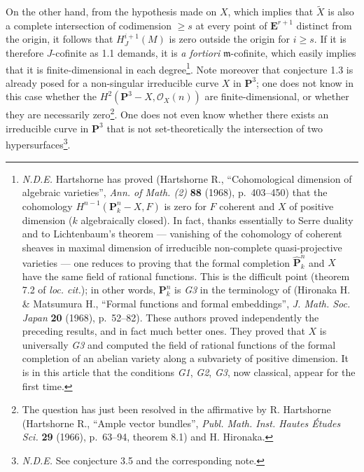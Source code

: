 \documentclass[
]{article}
\begin{document}
On the other hand, from the hypothesis made on \(X\), which implies that
\(\tilde{X}\) is also a complete intersection of codimension
\(\geqslant s\) at every point of \(\mathbf{E}^{r+1}\) distinct from the
origin, it follows that \(H^{i+1}_{J}(M)\) is zero outside the origin
for \(i \geqslant s\). If it is therefore \(J\)-cofinite as 1.1 demands,
it is \emph{a fortiori} \(\mathfrak{m}\)-cofinite, which easily implies
that it is finite-dimensional in each degree\footnote{\emph{N.D.E.}
  Hartshorne has proved (Hartshorne R., ``Cohomological dimension of
  algebraic varieties'', \emph{Ann. of Math. (2)} \textbf{88} (1968),
  p.~403--450) that the cohomology
  \(H^{n-1}(\mathbf{P}^{n}_{k} - X, F)\) is zero for \(F\) coherent and
  \(X\) of positive dimension (\(k\) algebraically closed). In fact,
  thanks essentially to Serre duality and to Lichtenbaum's theorem ---
  vanishing of the cohomology of coherent sheaves in maximal dimension
  of irreducible non-complete quasi-projective varieties --- one reduces
  to proving that the formal completion \(\hat{\mathbf{P}}^{n}_{k}\) and
  \(X\) have the same field of rational functions. This is the difficult
  point (theorem 7.2 of \emph{loc. cit.}); in other words,
  \(\mathbf{P}^{n}_{k}\) is \emph{G3} in the terminology of (Hironaka H.
  \& Matsumura H., ``Formal functions and formal embeddings'', \emph{J.
  Math. Soc. Japan} \textbf{20} (1968), p.~52--82). These authors proved
  independently the preceding results, and in fact much better ones.
  They proved that \(X\) is universally \emph{G3} and computed the field
  of rational functions of the formal completion of an abelian variety
  along a subvariety of positive dimension. It is in this article that
  the conditions \emph{G1}, \emph{G2}, \emph{G3}, now classical, appear
  for the first time.}. Note moreover that conjecture 1.3 is already
posed for a non-singular irreducible curve \(X\) in \(\mathbf{P}^{3}\);
one does not know in this case whether the
\(H^{2}(\mathbf{P}^{3} - X, \mathcal{O}_{X}(n))\) are
finite-dimensional, or whether they are necessarily zero\footnote{The
  question has just been resolved in the affirmative by R. Hartshorne
  (Hartshorne R., ``Ample vector bundles'', \emph{Publ. Math. Inst.
  Hautes Études Sci.} \textbf{29} (1966), p.~63--94, theorem 8.1) and H.
  Hironaka.}. One does not even know whether there exists an irreducible
curve in \(\mathbf{P}^{3}\) that is not set-theoretically the
intersection of two hypersurfaces\footnote{\emph{N.D.E.} See conjecture
  3.5 and the corresponding note.}.
\end{document}
